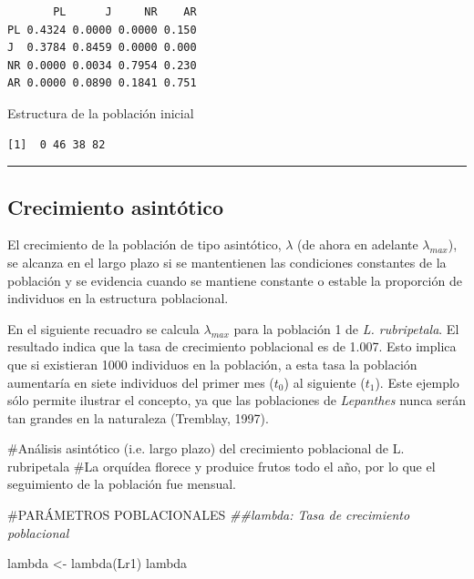 \documentclass[
  12pt,
  letterpaper,
]{book}
\newenvironment{Shaded}{\begin{snugshade}}{\end{snugshade}}
\newcommand{\CommentTok}[1]{\textcolor[rgb]{0.37,0.37,0.37}{#1}}
\newcommand{\DocumentationTok}[1]{\textcolor[rgb]{0.37,0.37,0.37}{\textit{#1}}}
\newcommand{\FunctionTok}[1]{\textcolor[rgb]{0.28,0.35,0.67}{#1}}
\newcommand{\NormalTok}[1]{\textcolor[rgb]{0.00,0.23,0.31}{#1}}
\newcommand{\OtherTok}[1]{\textcolor[rgb]{0.00,0.23,0.31}{#1}}
\begin{document}
\begin{verbatim}
       PL      J     NR    AR
PL 0.4324 0.0000 0.0000 0.150
J  0.3784 0.8459 0.0000 0.000
NR 0.0000 0.0034 0.7954 0.230
AR 0.0000 0.0890 0.1841 0.751
\end{verbatim}

Estructura de la población inicial

\begin{verbatim}
[1]  0 46 38 82
\end{verbatim}

\begin{center}\rule{0.5\linewidth}{0.5pt}\end{center}

\subsection{Crecimiento asintótico}\label{crecimiento-asintuxf3tico}

El crecimiento de la población de tipo asintótico, \(λ\) (de ahora en
adelante \(λ_{max}\)), se alcanza en el largo plazo si se mantentienen
las condiciones constantes de la población y se evidencia cuando se
mantiene constante o estable la proporción de individuos en la
estructura poblacional.

En el siguiente recuadro se calcula \(λ_{max}\) para la población 1 de
\emph{L. rubripetala}. El resultado indica que la tasa de crecimiento
poblacional es de 1.007. Esto implica que si existieran 1000 individuos
en la población, a esta tasa la población aumentaría en siete individuos
del primer mes (\(t_{0}\)) al siguiente (\(t_{1}\)). Este ejemplo sólo
permite ilustrar el concepto, ya que las poblaciones de \emph{Lepanthes}
nunca serán tan grandes en la naturaleza (Tremblay, 1997).

\begin{Shaded}
\begin{Highlighting}[]
\CommentTok{\#Análisis asintótico (i.e. largo plazo) del crecimiento poblacional de L. rubripetala}
\CommentTok{\#La orquídea florece y produice frutos todo el año, por lo que el seguimiento de la población fue mensual. }

\CommentTok{\#PARÁMETROS POBLACIONALES}
\DocumentationTok{\#\#lambda: Tasa de crecimiento poblacional}

\NormalTok{lambda }\OtherTok{\textless{}{-}} \FunctionTok{lambda}\NormalTok{(Lr1)}
\NormalTok{lambda}
\end{Highlighting}
\end{Shaded}
\end{document}

